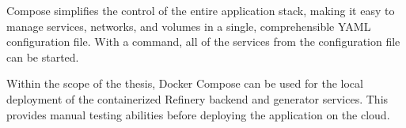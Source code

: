 		Compose simplifies the control of the entire application stack, making it easy to manage services, 
		networks, and volumes in a single, comprehensible YAML configuration file. 
		With a command, all of the services from the configuration file can be started.

		Within the scope of the thesis, Docker Compose can be used for the local deployment of 
		the containerized Refinery backend and generator services. This provides manual testing abilities
		before deploying the application on the cloud.

